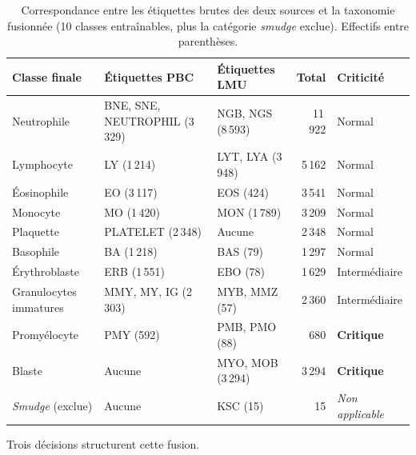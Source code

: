 \begin{table}[H]
  \centering
  \small
  \setlength{\tabcolsep}{4pt}
  \renewcommand{\arraystretch}{1.2}
  \begin{tabular}{@{}>{\raggedright\arraybackslash}p{2.3cm} >{\raggedright\arraybackslash}p{4.2cm} >{\raggedright\arraybackslash}p{2.9cm} r >{\raggedright\arraybackslash}p{2.0cm}@{}}
    \toprule
    \textbf{Classe finale} & \textbf{Étiquettes PBC} & \textbf{Étiquettes LMU} & \textbf{Total} & \textbf{Criticité} \\
    \midrule
    Neutrophile            & BNE, SNE, NEUTROPHIL (3\,329) & NGB, NGS (8\,593) & 11\,922 & Normal \\
    Lymphocyte             & LY (1\,214)                   & LYT, LYA (3\,948) & 5\,162  & Normal \\
    Éosinophile            & EO (3\,117)                   & EOS (424)         & 3\,541  & Normal \\
    Monocyte               & MO (1\,420)                   & MON (1\,789)      & 3\,209  & Normal \\
    Plaquette              & PLATELET (2\,348)             & Aucune            & 2\,348  & Normal \\
    Basophile              & BA (1\,218)                   & BAS (79)          & 1\,297  & Normal \\
    Érythroblaste          & ERB (1\,551)                  & EBO (78)          & 1\,629  & Intermédiaire \\
    Granulocytes immatures & MMY, MY, IG (2\,303)          & MYB, MMZ (57)     & 2\,360  & Intermédiaire \\
    Promyélocyte           & PMY (592)                     & PMB, PMO (88)     & 680     & \textbf{Critique} \\
    Blaste                 & Aucune                        & MYO, MOB (3\,294) & 3\,294  & \textbf{Critique} \\
    \midrule
    \emph{Smudge} (exclue) & Aucune                        & KSC (15)          & 15      & \textit{Non applicable} \\
    \bottomrule
  \end{tabular}
  \caption{Correspondance entre les étiquettes brutes des deux sources et la taxonomie fusionnée (10 classes entraînables, plus la catégorie \emph{smudge} exclue).
Effectifs entre parenthèses.}
  \label{tab:fusion-taxonomie}
\end{table}

Trois décisions structurent cette fusion.

